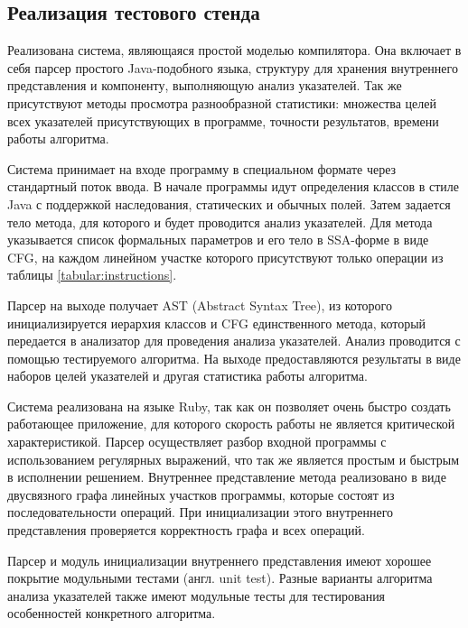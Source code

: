 \documentclass[14pt,titlepage]{extarticle}
\newcommand{\eng}[1]{{\English#1}}
\begin{document}
    \subsection{Реализация тестового стенда}

      Реализована система, являющаяся простой моделью компилятора. Она включает
      в себя парсер простого Java-подобного языка, структуру для хранения
      внутреннего представления и компоненту, выполняющую анализ указателей.
      Так же присутствуют методы просмотра разнообразной статистики: множества
      целей всех указателей присутствующих в программе, точности результатов,
      времени работы алгоритма.

      Система принимает на входе программу в специальном формате через
      стандартный поток ввода. В начале программы идут определения классов в
      стиле Java с поддержкой наследования, статических и обычных полей. Затем
      задается тело метода, для которого и будет проводится анализ указателей.
      Для метода указывается список формальных параметров и его тело в
      SSA-форме в виде CFG, на каждом линейном участке которого присутствуют
      только операции из таблицы \ref{tabular:instructions}.

      Парсер на выходе получает AST (\eng{Abstract Syntax Tree}), из которого
      инициализируется иерархия классов и CFG единственного метода, который
      передается в анализатор для проведения анализа указателей. Анализ
      проводится с помощью тестируемого алгоритма. На выходе предоставляются
      результаты в виде наборов целей указателей и
      другая статистика работы алгоритма.

      Система реализована на языке Ruby, так как он позволяет очень быстро
      создать работающее приложение, для которого скорость работы не является
      критической характеристикой. Парсер осуществляет разбор входной
      программы с использованием регулярных выражений, что так же является
      простым и быстрым в исполнении решением. Внутреннее представление метода
      реализовано в виде двусвязного графа линейных участков программы,
      которые состоят из последовательности операций. При инициализации этого
      внутреннего представления проверяется корректность графа и всех операций.

      Парсер и модуль инициализации внутреннего представления имеют хорошее
      покрытие модульными тестами (англ. \eng{unit test}). Разные варианты
      алгоритма анализа указателей также имеют модульные тесты для тестирования
      особенностей конкретного алгоритма.
\end{document}

